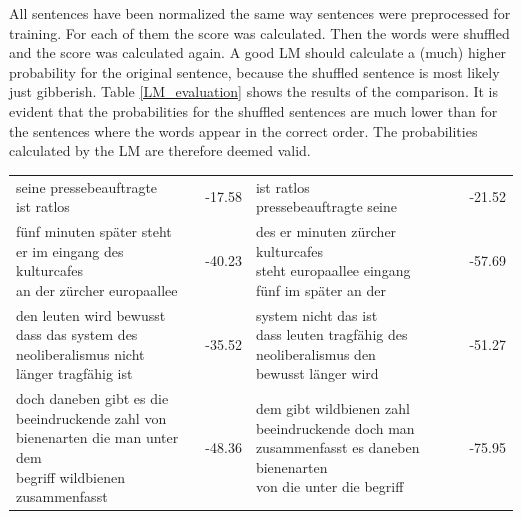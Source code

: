 All sentences have been normalized the same way sentences were preprocessed for training. For each of them the score was calculated. Then the words were shuffled and the score was calculated again. A good \ac{LM} should calculate a (much) higher probability for the original sentence, because the shuffled sentence is most likely just gibberish.  Table \ref{LM_evaluation} shows the results of the comparison. It is evident that the probabilities for the shuffled sentences are much lower than for the sentences where the words appear in the correct order. The probabilities calculated by the \ac{LM} are therefore deemed valid.

\begin{table}[!htbp]
	\centering
	\begin{tabular}{lrlr}
		\toprule
		\thead{original sentence (normalized)} & \thead{score} & \thead{permuation} & \thead{score} \\
		\midrule
		\makecell[l]{seine pressebeauftragte\\ist ratlos} & -17.58 & \makecell[l]{ist ratlos\\pressebeauftragte seine} & -21.52 \\
		\makecell[l]{fünf minuten später steht\\er im eingang des kulturcafes\\an der zürcher europaallee} & -40.23 & \makecell[l]{des er minuten zürcher kulturcafes\\steht europaallee eingang\\fünf im später an der} & -57.69 \\
		\makecell[l]{den leuten wird bewusst\\dass das system des \\ neoliberalismus nicht\\länger tragfähig ist} & -35.52 & \makecell[l]{system nicht das ist\\dass leuten tragfähig des\\neoliberalismus den\\bewusst länger wird} & -51.27 \\
		\makecell[l]{doch daneben gibt es die\\beeindruckende zahl von \code{<num>}\\bienenarten die man unter dem\\begriff wildbienen zusammenfasst} & -48.36 & \makecell[l]{dem gibt wildbienen zahl\\beeindruckende doch man\\zusammenfasst es daneben bienenarten\\von die unter die \code{<num>} begriff} & -75.95 \\

\end{tabular}
\end{table}
